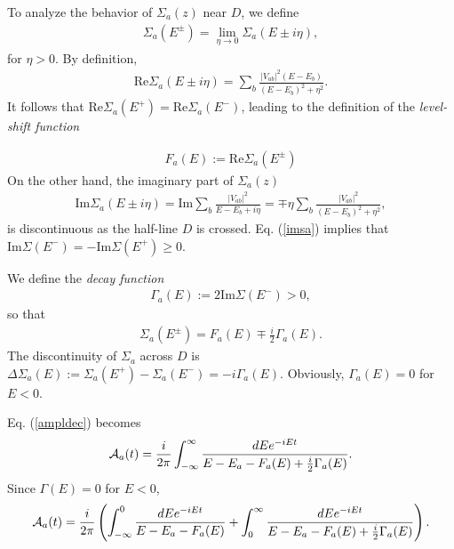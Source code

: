 \documentclass[12pt]{article}
\numberwithin{equation}{section}
\begin{document}
To analyze the behavior of  $\Sigma_a(z)$ near $D$, we define
\begin{eqnarray}
\Sigma_a(E^{\pm}) = \lim_{\eta \rightarrow 0} \Sigma_a(E\pm i\eta),
 \end{eqnarray}
for $\eta > 0$. By definition,
\begin{eqnarray}
\mbox{Re} \Sigma_a(E\pm  i \eta) = \sum_b \frac{|V_{ab}|^2(E-E_b)}{(E  - E_b)^2 +  \eta^2}.
\end{eqnarray}
It follows that $\mbox{Re} \Sigma_a(E^+) = \mbox{Re} \Sigma_a(E^-)$, leading to the definition of the {\em level-shift function}

\begin{eqnarray}
F_a(E) := \mbox{Re}  \Sigma_a(E^{\pm})  \label{faE}
\end{eqnarray}
On the other hand, the imaginary part of $\Sigma_a(z)$
\begin{eqnarray}
\mbox{Im} \Sigma_a(E\pm  i \eta) = \mbox{Im} \sum_b \frac{|V_{ab}|^2}{E  - E_b + i \eta} = \mp \eta \sum_b \frac{|V_{ab}|^2}{(E  - E_b)^2 +  \eta^2}, \label{imsa}
\end{eqnarray}
 is discontinuous as the half-line $D$ is crossed.  Eq. (\ref{imsa}) implies that   $\mbox{Im} \Sigma(E^-) = - \mbox{Im} \Sigma(E^+)\geq 0$.

We define the {\em decay function}
\begin{eqnarray}
\Gamma_a(E) := 2 \mbox{Im}  \Sigma(E^-) > 0, \label{gammaE}
\end{eqnarray}
 so that
 \begin{eqnarray}
 \Sigma_a(E^{\pm}) = F_a(E) \mp \frac{i}{2} \Gamma_a(E).
 \end{eqnarray}
  The discontinuity of $\Sigma_a$  across $D$  is
$\Delta \Sigma_a(E) := \Sigma_a(E^+) - \Sigma_a(E^-) = - i \Gamma_a(E)$.
Obviously,  $\Gamma_a(E) = 0$ for $E < 0$.

  Eq. (\ref{ampldec}) becomes
\begin{eqnarray}
{\cal A}_a(t) = \frac{i}{2 \pi  }   \int_{-\infty }^{\infty } \frac{dE e^{-iEt}}{E  - E_a - F_a(E) + \frac{i}{2} \Gamma_a(E)}. \label{ampldecb}
\end{eqnarray}
Since $\Gamma(E) = 0$ for $E < 0$,
\begin{eqnarray}
{\cal A}_a(t) = \frac{i}{2 \pi }  \left( \int_{-\infty }^{0} \frac{dE e^{-iEt}}{E  - E_a - F_a(E)}+ \int_{0 }^{\infty } \frac{dE e^{-iEt}}{E  - E_a - F_a(E) + \frac{i}{2} \Gamma_a(E)} \right). \label{ampldecc}
\end{eqnarray}
\end{document}
